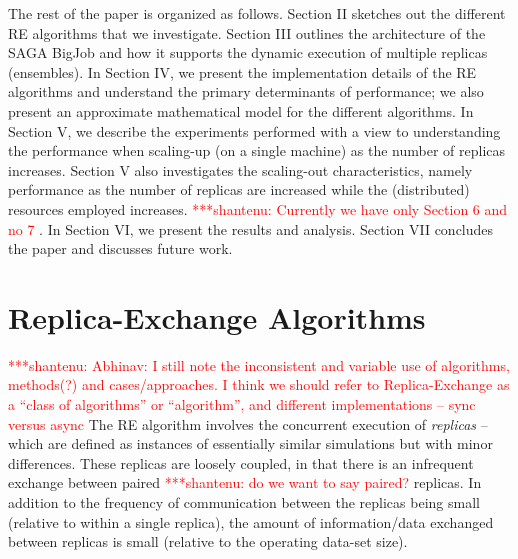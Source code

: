 \documentclass{rspublic}
\newcommand{\jhanote}[1]{ {\textcolor{red} { ***shantenu: #1 }}}
\newcommand{\alnote}[1]{ {\textcolor{blue} { ***andre: #1 }}}
\newcommand{\alnote}[1]{}
\newcommand{\jhanote}[1]{}
\begin{document}
The rest of the paper is organized as follows. Section II sketches out
the different RE algorithms that we investigate. Section III outlines
the architecture of the SAGA BigJob and how it supports the dynamic
execution of multiple replicas (ensembles). In Section IV, we present
the implementation details of the RE algorithms and understand
the primary determinants of performance; we also present
an approximate mathematical model for the different algorithms.
In Section V, we describe the experiments performed with a view to
understanding the performance when scaling-up (on a single machine) as
the number of replicas increases. Section V also investigates the
scaling-out characteristics, namely performance as the number of
replicas are increased while the (distributed) resources employed
increases. %
\jhanote{Currently we have only Section 6 and no 7}. In Section VI, we
present the results and analysis.  Section VII concludes the paper and
discusses future work.


\section{Replica-Exchange Algorithms}
\label{sec:repex-approach}
\jhanote{Abhinav: I still note the inconsistent and variable use of
  algorithms, methods(?) and cases/approaches. I think we should refer
  to Replica-Exchange as a ``class of algorithms'' or ``algorithm'',
  and different implementations -- sync versus async} The RE algorithm
involves the concurrent execution of \emph{replicas} -- which are
defined as instances of essentially similar simulations but with minor
differences. These replicas are loosely coupled, in that there is an
infrequent exchange between paired \jhanote{do we want to say paired?}
replicas. In addition to the frequency of communication between the
replicas being small (relative to within a single replica), the amount
of information/data exchanged between replicas is small (relative to
the operating data-set size).

\end{document}
